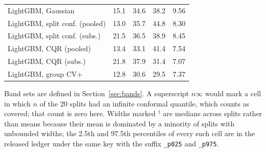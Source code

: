\begin{table}[!tp]
\begin{tabular}{@{}lrrrr@{}}
\quad LightGBM, Gaussian & 15.1 & 34.6 & 38.2 & 9.56 \\
\quad LightGBM, split conf. (pooled) & 13.0 & 35.7 & 44.8 & 8.30 \\
\quad LightGBM, split conf. (subs.) & 21.5 & 36.5 & 38.9 & 8.45 \\
\quad LightGBM, CQR (pooled) & 13.4 & 33.1 & 41.4 & 7.54 \\
\quad LightGBM, CQR (subs.) & 21.8 & 37.9 & 31.4 & 7.07 \\
\quad LightGBM, group CV+ & 12.8 & 30.6 & 29.5 & 7.37 \\
\bottomrule
\end{tabular}
\par\smallskip\raggedright\footnotesize Band sets are defined in Section~\ref{sec:bands}. A superscript $n\infty$ would mark a cell in which $n$ of the 20 splits had an infinite conformal quantile, which counts as covered; that count is zero here. Widths marked $^{\dagger}$ are medians across splits rather than means because their mean is dominated by a minority of splits with unbounded widths; the 2.5th and 97.5th percentiles of every such cell are in the released ledger under the same key with the suffix \texttt{\_p025} and \texttt{\_p975}. 
\end{table}
